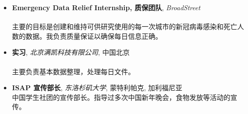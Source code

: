 \documentclass[10pt]{ctexart}
\newcommand{\insertvspace}{%
	\rlap{\color{white}\rule{.4pt}{0.4\baselineskip}}%
	\vspace{\parskip}}%
\begin{document}

	\insertvspace
	\noindent
	\begin{minipage}[t]{0.5\textwidth}		
		\begin{itemize}[leftmargin=*]
			\small
			\item[]
			\textbf{Emergency Data Relief Internship, 质保团队}, \textit{BroadStreet} \\
			 \\
			主要的目标是创建和维持可供研究使用的每一次城市的新冠病毒感染和死亡人数的数据。我负责质量保证以确保每日信息正确。
			
			\item[] 
			\textbf{实习}, \textit{北京满凯科技有限公司}, 中国北京\\
			 \\
			主要负责基本数据整理，处理每日文件。
		\end{itemize}
	\end{minipage}\hspace{0.3in}  %
	\begin{minipage}[t]{0.45\textwidth}
		\begin{itemize}[leftmargin=*]
			\item[] 
			\small
			\textbf{ISAP 宣传部长}, \textit{东洛杉矶大学}, 蒙特利帕克, 加利福尼亚 \\
			中国学生社团的宣传部长。指导过多次中国新年晚会，食物发放等活动的宣传。
		\end{itemize}
	\end{minipage}

\end{document}
